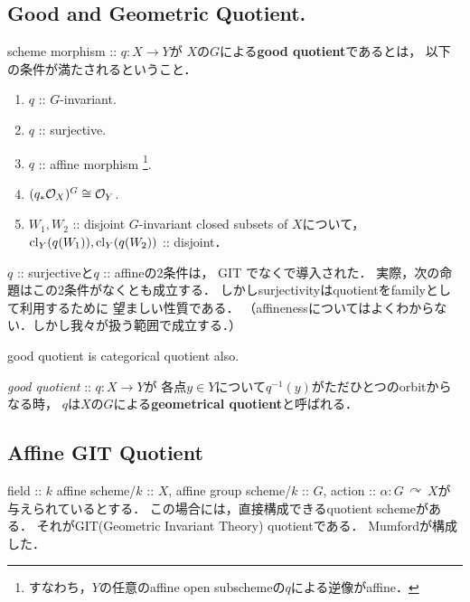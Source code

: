 \documentclass[a4paper]{jsarticle}
\newcommand{\acton}{\,\curvearrowright\,}
\begin{document}
    \subsection{Good and Geometric Quotient.}
    \begin{Def} \label{def:good_quotient}
        scheme morphism :: $q: X \to Y$が
        $X$の$G$による\textbf{good quotient}であるとは，
        以下の条件が満たされるということ．
        \begin{enumerate}[label=(\roman*), leftmargin=*]
        \item $q$ :: $G$-invariant.
        \item $q$ :: surjective.
        \item $q$ :: affine morphism
              \footnote{ すなわち，$Y$の任意のaffine open subschemeの$q$による逆像がaffine． }.
        \item $(q_*\mathcal{O}_X)^G \cong \mathcal{O}_Y$.
        \item
            $W_1, W_2$ :: disjoint $G$-invariant closed subsets of $X$について，
            $\operatorname{cl}_Y(q(W_1)), \operatorname{cl}_Y(q(W_2))$ :: disjoint．
    \end{enumerate}
    \end{Def}
    $q$ :: surjectiveと$q$ :: affineの2条件は，
    GIT \cite{GIT}でなく\cite{Ses}で導入された．
    実際，次の命題はこの2条件がなくとも成立する．
    しかしsurjectivityはquotientをfamilyとして利用するために
    望ましい性質である．
    （affinenessについてはよくわからない．しかし我々が扱う範囲で成立する．）

    \begin{Prop}
        good quotient is categorical quotient also.
    \end{Prop}

    \begin{Def}
        \textit{good quotient} :: $q: X \to Y$が
        各点$y \in Y$について$q^{-1}(y)$がただひとつのorbitからなる時，
        $q$は$X$の$G$による\textbf{geometrical quotient}と呼ばれる．
    \end{Def}


    \subsection{Affine GIT Quotient}
    field :: $k$
    affine scheme/$k$ :: $X$,
    affine group scheme/$k$ :: $G$,
    action :: $\alpha: G \acton X$が与えられているとする．
    この場合には，直接構成できるquotient schemeがある．
    それがGIT(Geometric Invariant Theory) quotientである．
    Mumfordが構成した．
    
\end{document}
